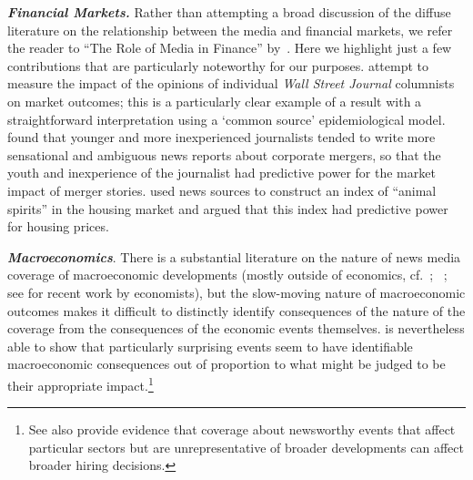 \textbf{\textit{Financial Markets.}}  Rather than attempting a broad discussion of the diffuse literature on the relationship between the media and financial markets, we refer the reader to ``The Role of Media in Finance'' by~\cite{TETLOCK2015701}.  Here we highlight just a few contributions that are particularly noteworthy for our purposes. %
\href{https://www.researchgate.net/publication/227465410_Journalists_and_the_Stock_Market}{\cite{dougal2012journalists}} attempt to measure the impact of the opinions of individual \textit{Wall Street Journal} columnists on market outcomes; this is a particularly clear example of a result with a straightforward interpretation using a `common source' epidemiological model.  \href{https://www.public.asu.edu/~dsosyura/ResearchPapers/Rumor\%20Has\%20It\%20--\%20Sensationalism\%20in\%20Financial\%20Media.pdf}{\cite{ahern2015rumor}} found that younger and more inexperienced journalists tended to write more sensational and ambiguous news reports about corporate mergers, so that the youth and inexperience of the journalist had predictive power for the market impact of merger stories. %
\href{https://www.stern.nyu.edu/sites/default/files/assets/documents/con_040497.pdf}{\cite{soo_quantifying_2015}} used news sources to construct an index of ``animal spirits'' in the housing market and argued that this index had predictive power for housing prices.

\textbf{\textit{Macroeconomics}}.  There is a substantial literature on the nature of news media coverage of macroeconomic developments (mostly outside of economics, cf.~\cite{soroka2015s}; ~\cite{damstra2021economy}; see  \cite{bybee2020structure} for recent work by economists), but the slow-moving nature of macroeconomic outcomes makes it difficult to distinctly identify consequences of the nature of the coverage from the consequences of the economic events themselves.  \cite{nimark2014man} is nevertheless able to show that particularly surprising events seem to have identifiable macroeconomic consequences out of proportion to what might be judged to be their appropriate impact.\footnote{See also \cite{chahrour2021sectoral} provide evidence that coverage about newsworthy events that affect particular sectors but are unrepresentative of broader developments can affect broader hiring decisions.}

